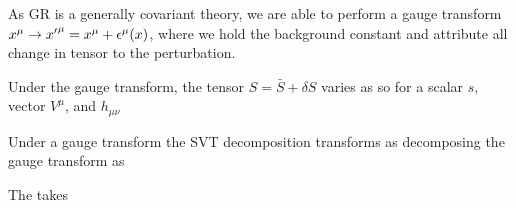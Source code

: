 \documentclass{article}
\begin{document}
As GR is a generally covariant theory, we are able to perform a gauge transform $x^\mu \to {x^\prime}^\mu = x^\mu + \epsilon^\mu(x)$, where we hold the background constant and attribute all change in tensor to the perturbation. 

\begin{prop}
Under the gauge transform, the tensor $S = \bar{S} + \delta S$ varies as 
so for a scalar $s$, vector $V^\mu$, and $h_{\mu\nu}$
\end{prop}

\begin{prop}
Under a gauge transform the SVT decomposition transforms as 
decomposing the gauge transform as 
\end{prop}

\begin{definition}
The  takes 
\end{definition}
\end{document}
